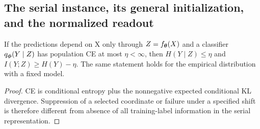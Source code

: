 \subsection{The serial instance, its general initialization, and the normalized readout}
\label{sec:astra_serial}
\begin{proposition}
\label{prop:astra_information}
If the predictions depend on X only through $Z=f_{\boldsymbol{\theta}}(X)$ and a
classifier $q_{\boldsymbol{\phi}}(Y\mid Z)$ has population CE at most $\eta<\infty$,
then $H(Y\mid Z)\le\eta$ and $I(Y;Z)\ge H(Y)-\eta$.
The same statement holds for the empirical distribution with a fixed model.
\end{proposition}
\begin{proof}
CE is conditional entropy plus the nonnegative expected conditional KL
divergence. Suppression of a selected coordinate or failure under a
specified shift is therefore different from absence of all training-label
information in the serial representation.
\end{proof}

